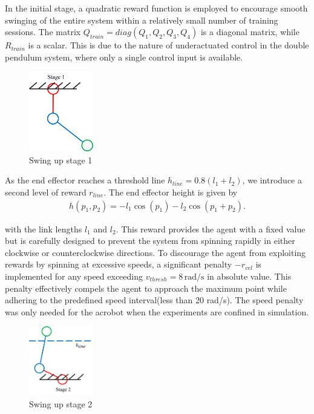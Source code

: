 In the initial stage, a quadratic reward function is employed to encourage
smooth swinging of the entire system within a relatively small number of
training sessions. The matrix  \(Q_{train} = diag(Q_1, Q_2, Q_3, Q_4)\) is a
diagonal matrix, while \(R_{train}\) is a scalar. This is due to the nature
of underactuated control in the double pendulum system, where only a single
control input is available.

\begin{figure}[H]
    \centering
    \includegraphics[width=0.25\textwidth]{figures/methodology/stage1.png} %
    \caption{Swing up stage 1}
    \label{fig:stage1} %
\end{figure}

As the end effector reaches a threshold line \(h_{line} = 0.8(l_1+l_2)\), we
introduce a second level of reward \(r_{line}\). The end effector height is
given by
\begin{align}
    h(p_1, p_2) = -l_1\cos(p_1) - l_2 \cos(p_1 + p_2).
\end{align}

with the link lengths $l_1$ and $l_2$.
This reward provides the agent with a fixed value
but is carefully designed to prevent the system from spinning rapidly in either
clockwise or counterclockwise directions. To discourage the agent from
exploiting rewards by spinning at excessive speeds, a significant penalty
\(-r_{vel}\) is implemented for any speed exceeding $v_{thresh}=8\,
\text{rad}/\text{s}$ in absolute value.
This penalty effectively compels the agent to approach the maximum point while
adhering to the predefined speed interval(less than 20 rad/s). The speed penalty was only needed for the acrobot when the experiments are confined in simulation.

\begin{figure}[H]
    \centering
    \includegraphics[width=0.25\textwidth]{figures/methodology/stage2.png} %
    \caption{Swing up stage 2}
    \label{fig:stage2} %
\end{figure}

